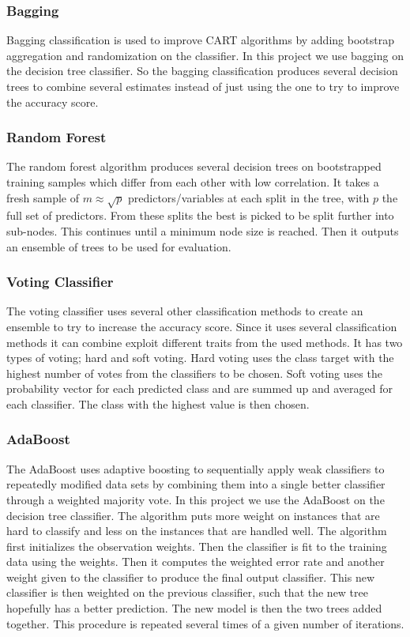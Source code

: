 \documentclass[12pt,a4paper,english]{article}
\begin{document}
\subsubsection{Bagging}
\label{subsubsect:Bag}
Bagging classification is used to improve CART algorithms by adding bootstrap aggregation and randomization on the classifier. In this project we use bagging on the decision tree classifier. So the bagging classification produces several decision trees to combine several estimates instead of just using the one to try to improve the accuracy score.

\subsubsection{Random Forest}
\label{subsubsect:Forest}
The random forest algorithm produces several decision trees on bootstrapped training samples which differ from each other with low correlation. It takes a fresh sample of $m\approx\sqrt{p}$ predictors/variables at each split in the tree, with $p$ the full set of predictors. From these splits the best is picked to be split further into sub-nodes. This continues until a minimum node size is reached. Then it outputs an ensemble of trees to be used for evaluation.

\subsubsection{Voting Classifier}
\label{subsubsect:Vote}
The voting classifier uses several other classification methods to create an ensemble to try to increase the accuracy score. Since it uses several classification methods it can combine exploit different traits from the used methods. It has two types of voting; hard and soft voting. Hard voting uses the class target with the highest number of votes from the classifiers to be chosen. Soft voting uses the probability vector for each predicted class and are summed up and averaged for each classifier. The class with the highest value is then chosen. \cite{vote}

\subsubsection{AdaBoost}
\label{subsubsect:Ada}
The AdaBoost uses adaptive boosting to sequentially apply weak classifiers to repeatedly modified data sets by combining them into a single better classifier through a weighted majority vote. In this project we use the AdaBoost on the decision tree classifier. The algorithm puts more weight on instances that are hard to classify and less on the instances that are handled well. The algorithm first initializes the observation weights. Then the classifier is fit to the training data using the weights. Then it computes the weighted error rate and another weight given to the classifier to produce the final output classifier. This new classifier is then weighted on the previous classifier, such that the new tree hopefully has a better prediction. The new model is then the two trees added together. This procedure is repeated several times of a given number of iterations.  \cite{hastie2009}
\end{document}

